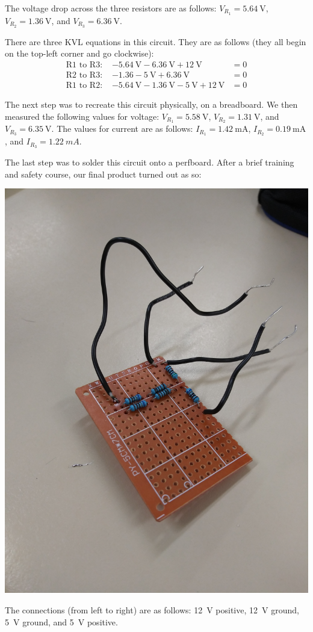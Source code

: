 \documentclass{article}
\begin{document}
\pagebreak

The voltage drop across the three resistors are as follows:
\(V_{R_1} = \SI{5.64}{\volt}\),
\(V_{R_2} = \SI{1.36}{\volt}\), and
\(V_{R_3} = \SI{6.36}{\volt}\).

There are three KVL equations in this circuit.
They are as follows (they all begin on the top-left corner
and go clockwise):
\begin{align*}
    \text{R1 to R3: }& -\SI{5.64}{\volt} - \SI{6.36}{\volt} + \SI{12}{\volt} &= 0\\
    \text{R2 to R3: }& -\SI{1.36} - \SI{5}{\volt} + \SI{6.36}{\volt} &= 0\\
    \text{R1 to R2: }& -\SI{5.64}{\volt} - \SI{1.36}{\volt} - \SI{5}{\volt} + \SI{12}{\volt} &= 0
\end{align*}

The next step was to recreate this circuit physically, on a
breadboard. We then measured the following values
for voltage: \(V_{R_1} = \SI{5.58}{\volt}\), \(V_{R_2} = \SI{1.31}{\volt}\),
and \(V_{R_3} = \SI{6.35}{\volt}\). The values for current are
as follows: \(I_{R_1} = \SI{1.42}{\milli\ampere}\),
\(I_{R_2} = \SI{0.19}{\milli\ampere}\), and
\(I_{R_3} = \SI{1.22}{mA}\).

The last step was to solder this circuit onto a perfboard.
After a brief training and safety course, our final product
turned out as so:

\includegraphics[width=\textwidth]{Images/20191029_142450.jpg}

The connections (from left to right) are as follows: \SI{12}{\volt}
positive, \SI{12}{V} ground, \SI{5}{V} ground, and \SI{5}{V} positive.
\end{document}
